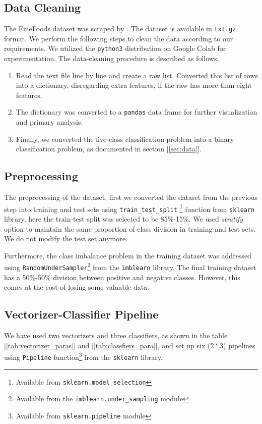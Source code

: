 \documentclass[11pt]{article}
\begin{document}
 \subsection{Data Cleaning}
The FineFoods dataset was scraped by \cite{finefoods}. The dataset is available in \texttt{txt.gz} format. We perform the following steps to clean the data according to our requirements. We utilized the \texttt{python3} distribution on Google Colab for experimentation. The data-cleaning procedure is described as follows,
\begin{enumerate}
    \item Read the text file line by line and create a raw list. Converted this list of rows into a dictionary, disregarding extra features, if the raw has more than eight features.
    \item The dictionary was converted to a \texttt{pandas} data frame for further visualization and primary analysis.
    \item Finally, we converted the five-class classification problem into a binary classification problem, as documented in section [\ref{sec:data}].
\end{enumerate}
 \subsection{Preprocessing}
The preprocessing of the dataset, first we converted the dataset from the previous step into training and test sets using \texttt{train\_test\_split} \footnote{Available from \texttt{sklearn.model\_selection}} function from \texttt{sklearn} library, here the train-test split was selected to be 85\%-15\%. We used \textit{stratify} option to maintain the same proportion of class division in training and test sets. We do not modify the test set anymore. 

Furthermore, the class imbalance problem in the training dataset was addressed using \texttt{RandomUnderSampler}\footnote{Available from the \texttt{imblearn.under\_sampling} module} from the \texttt{imblearn} library. The final training dataset has a 50\%-50\% division between positive and negative classes. However, this comes at the cost of losing some valuable data.

\subsection{Vectorizer-Classifier Pipeline}
We have used two vectorizers and three classifiers, as shown in the table [\ref{tab:vectorizer_paras}] and [\ref{tab:classfiers_para}], and set up six ($2 * 3$) pipelines using \texttt{Pipeline} function\footnote{Available from \texttt{sklearn.pipeline} module} from the \texttt{sklearn} library. 
\end{document}
